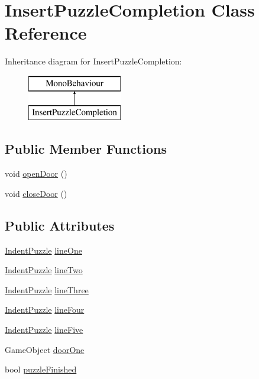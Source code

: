 \hypertarget{class_insert_puzzle_completion}{}\section{Insert\+Puzzle\+Completion Class Reference}
\label{class_insert_puzzle_completion}
Inheritance diagram for Insert\+Puzzle\+Completion\+:\begin{figure}[H]
\begin{center}
\leavevmode
\includegraphics[height=2.000000cm]{class_insert_puzzle_completion}
\end{center}
\end{figure}
\subsection*{Public Member Functions}
\begin{DoxyCompactItemize}
\item 
void \hyperlink{class_insert_puzzle_completion_a63718180926a577838dc477e4c9eeb1d}{open\+Door} ()
\item 
void \hyperlink{class_insert_puzzle_completion_a440c8d4d6b16f8c21edc989c9adbac4a}{close\+Door} ()
\end{DoxyCompactItemize}
\subsection*{Public Attributes}
\begin{DoxyCompactItemize}
\item 
\hyperlink{class_indent_puzzle}{Indent\+Puzzle} \hyperlink{class_insert_puzzle_completion_a578d448dd1fae88d97493a0f46b3ddd0}{line\+One}
\item 
\hyperlink{class_indent_puzzle}{Indent\+Puzzle} \hyperlink{class_insert_puzzle_completion_a90e3355e28d38eed7b71ab656607af65}{line\+Two}
\item 
\hyperlink{class_indent_puzzle}{Indent\+Puzzle} \hyperlink{class_insert_puzzle_completion_a52a264da1931ee1d58db091081843024}{line\+Three}
\item 
\hyperlink{class_indent_puzzle}{Indent\+Puzzle} \hyperlink{class_insert_puzzle_completion_a4dfdeae27ea5824db458883961b9d1e5}{line\+Four}
\item 
\hyperlink{class_indent_puzzle}{Indent\+Puzzle} \hyperlink{class_insert_puzzle_completion_a3069beb9bba0c0cfbcd52bd5e49db135}{line\+Five}
\item 
Game\+Object \hyperlink{class_insert_puzzle_completion_ad2291f7238e8f7ee355583d0a9da8b49}{door\+One}
\item 
bool \hyperlink{class_insert_puzzle_completion_a6184f335f81f3b544e6b065a9cccc084}{puzzle\+Finished}
\end{DoxyCompactItemize}


